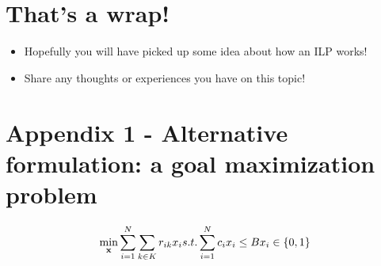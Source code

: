 \documentclass[
]{article}
\providecommand{\tightlist}{%
  \setlength{\itemsep}{0pt}\setlength{\parskip}{0pt}}
\begin{document}
\hypertarget{thats-a-wrap}{%
\section{That's a wrap!}\label{thats-a-wrap}}

\begin{itemize}
\tightlist
\item
  Hopefully you will have picked up some idea about how an ILP works!
\item
  Share any thoughts or experiences you have on this topic!
\end{itemize}

\hypertarget{appendix-1---alternative-formulation-a-goal-maximization-problem}{%
\section{Appendix 1 - Alternative formulation: a goal maximization
problem}\label{appendix-1---alternative-formulation-a-goal-maximization-problem}}

\[
\min_\mathbf{x} \sum_{i=1}^N \sum_{k\in K} r_{ik}x_i \\
s.t. \sum_{i=1}^N c_i x_i \leq B \\
x_i \in \{0,1\}
\]
\end{document}
